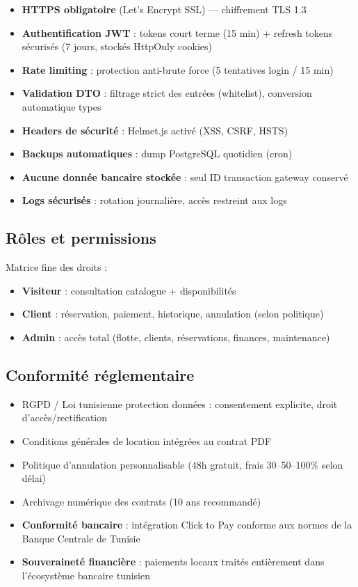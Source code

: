 \documentclass[12pt, a4paper]{article}
\begin{document}
\begin{itemize}[leftmargin=*,noitemsep]
  \item \textbf{HTTPS obligatoire} (Let's Encrypt SSL) — chiffrement TLS 1.3
  \item \textbf{Authentification JWT} : tokens court terme (15 min) + refresh tokens sécurisés (7 jours, stockés HttpOnly cookies)
  \item \textbf{Rate limiting} : protection anti-brute force (5 tentatives login / 15 min)
  \item \textbf{Validation DTO} : filtrage strict des entrées (whitelist), conversion automatique types
  \item \textbf{Headers de sécurité} : Helmet.js activé (XSS, CSRF, HSTS)
  \item \textbf{Backups automatiques} : dump PostgreSQL quotidien (cron)
  \item \textbf{Aucune donnée bancaire stockée} : seul ID transaction gateway conservé
  \item \textbf{Logs sécurisés} : rotation journalière, accès restreint aux logs
\end{itemize}

\subsection{Rôles et permissions}

Matrice fine des droits :
\begin{itemize}[leftmargin=*,noitemsep]
  \item \textbf{Visiteur} : consultation catalogue + disponibilités
  \item \textbf{Client} : réservation, paiement, historique, annulation (selon politique)
  \item \textbf{Admin} : accès total (flotte, clients, réservations, finances, maintenance)
\end{itemize}

\subsection{Conformité réglementaire}

\begin{itemize}[leftmargin=*,noitemsep]
  \item RGPD / Loi tunisienne protection données : consentement explicite, droit d'accès/rectification
  \item Conditions générales de location intégrées au contrat PDF
  \item Politique d'annulation personnalisable (48h gratuit, frais 30--50--100\% selon délai)
  \item Archivage numérique des contrats (10 ans recommandé)
  \item \textbf{Conformité bancaire} : intégration Click to Pay conforme aux normes de la Banque Centrale de Tunisie
  \item \textbf{Souveraineté financière} : paiements locaux traités entièrement dans l'écosystème bancaire tunisien
\end{itemize}
\end{document}
